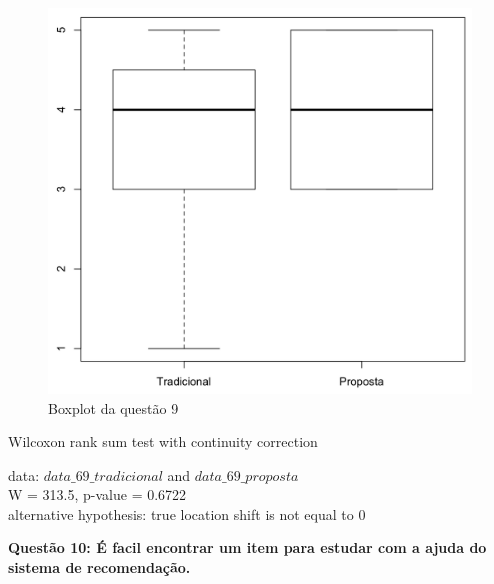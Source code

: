 \begin{figure}[htb]
  \caption{\label{fig:questao9-boxplot}Boxplot da questão 9}
  \begin{center}
      \includegraphics[scale=0.6]{./Figuras/questao9-boxplot.png}
  \end{center}
\end{figure}

Wilcoxon rank sum test with continuity correction

data:  $data\_69\_tradicional$ and $data\_69\_proposta$\\
W = 313.5, p-value = 0.6722\\
alternative hypothesis: true location shift is not equal to 0

\newpage
\textbf{Questão 10: É facil encontrar um item para estudar com a ajuda do sistema de recomendação.}

